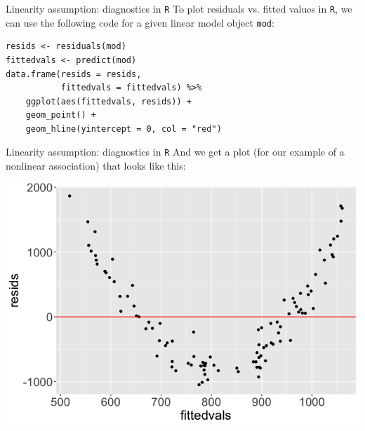 \documentclass[10pt,t]{beamer}
\begin{document}
\begin{frame}[fragile]{Linearity assumption: diagnostics in \texttt{R}}
To plot residuals vs. fitted values in \texttt{R}, we can use the following code for a given linear model object \texttt{mod}:

\vspace{0.2cm}

\begin{lstlisting}
resids <- residuals(mod)
fittedvals <- predict(mod)
data.frame(resids = resids,
           fittedvals = fittedvals) %>%
	ggplot(aes(fittedvals, resids)) +
	geom_point() +
	geom_hline(yintercept = 0, col = "red") 
\end{lstlisting}


\end{frame}

\begin{frame}{Linearity assumption: diagnostics in \texttt{R}}
And we get a plot (for our example of a nonlinear association) that looks like this:

\centering \includegraphics[scale=0.3]{fitted_resids.png}

\end{frame}
\end{document}
